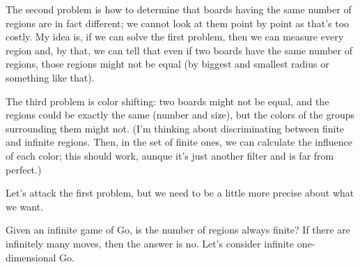 The second problem is how to determine that boards having the same number of regions are in fact different; we cannot look at them point by point as that's too costly. My idea is, if we can solve the first problem, then we can measure every region and, by that, we can tell that even if two boards have the same number of regions, those regions might not be equal (by biggest and smallest radius or something like that). 

The third problem is color shifting: two boards might not be equal, and the regions could be exactly the same (number and size), but the colors of the groups surrounding them might not. (I'm thinking about discriminating between finite and infinite regions. Then, in the set of finite ones, we can calculate the influence of each color; this should work, aunque it's just another filter and is far from perfect.)


 Let's attack the first problem, but we need to be a little more precise about what we want.
 
Given an infinite game of Go, is the number of regions always finite? If there are infinitely many moves, then the answer is no. Let's consider infinite one-dimensional Go.

